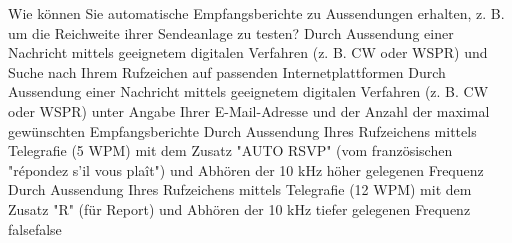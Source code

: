     {Wie können Sie automatische Empfangsberichte zu Aussendungen erhalten, z. B. um die Reichweite ihrer Sendeanlage zu testen?}
    {Durch Aussendung einer Nachricht mittels geeignetem digitalen Verfahren (z. B. CW oder WSPR) und Suche nach Ihrem Rufzeichen auf passenden Internetplattformen}
    {Durch Aussendung einer Nachricht mittels geeignetem digitalen Verfahren (z. B. CW oder WSPR) unter Angabe Ihrer E-Mail-Adresse und der Anzahl der maximal gewünschten Empfangsberichte}
    {Durch Aussendung Ihres Rufzeichens mittels Telegrafie (5 WPM) mit dem Zusatz "AUTO RSVP" (vom französischen "répondez s'il vous pla\^it") und Abhören der 10 kHz höher gelegenen Frequenz}
    {Durch Aussendung Ihres Rufzeichens mittels Telegrafie (12 WPM) mit dem Zusatz "R" (für Report) und Abhören der 10 kHz tiefer gelegenen Frequenz}
    {false}{false}
